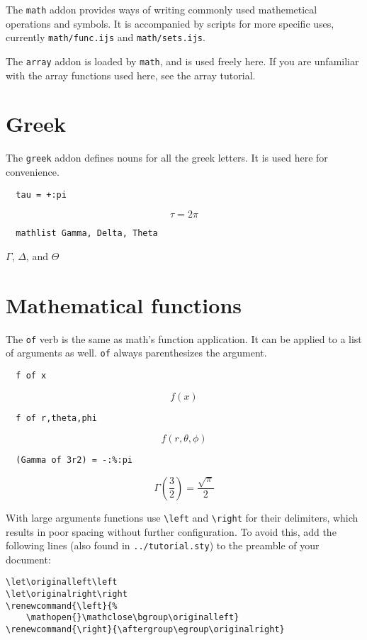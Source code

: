 \documentclass{article}
\begin{document}
The \lstinline`math` addon provides ways of writing commonly used mathemetical
operations and symbols. It is accompanied by scripts for more specific
uses, currently \lstinline`math/func.ijs` and \lstinline`math/sets.ijs`.

The \lstinline`array` addon is loaded by \lstinline`math`, and is used freely here. If you
are unfamiliar with the array functions used here, see the array tutorial.

\section{Greek}
The \lstinline`greek` addon defines nouns for all the greek letters. It is used
here for convenience.
\begin{lstlisting}
  tau = +:pi
\end{lstlisting}
\[\tau=2 \pi\]
\begin{lstlisting}
  mathlist Gamma, Delta, Theta
\end{lstlisting}
$\Gamma$, $\Delta$, and $\Theta$

\section{Mathematical functions}
The \lstinline`of` verb is the same as math's function application. It can be
applied to a list of arguments as well. \lstinline`of` always parenthesizes the
argument.
\begin{lstlisting}
  f of x
\end{lstlisting}
\[f(x)\]
\begin{lstlisting}
  f of r,theta,phi
\end{lstlisting}
\[f(r,\theta,\phi)\]
\begin{lstlisting}
  (Gamma of 3r2) = -:%:pi
\end{lstlisting}
\[\Gamma\left(\frac{3}{2}\right)=\frac{\sqrt{\pi}}{2}\]

With large arguments functions use \lstinline`\left` and \lstinline`\right` for their
delimiters, which results in poor spacing without further configuration.
To avoid this, add the following lines (also found in \lstinline`../tutorial.sty`)
to the preamble of your document:
\begin{verbatim}
\let\originalleft\left
\let\originalright\right
\renewcommand{\left}{%
    \mathopen{}\mathclose\bgroup\originalleft}
\renewcommand{\right}{\aftergroup\egroup\originalright}
\end{verbatim}
\end{document}
